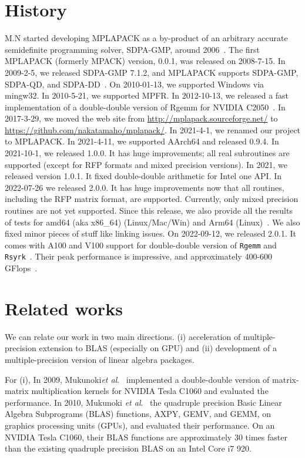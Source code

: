 \documentclass[12pt]{article}
\newcommand{\etal}{\textit{et al}.}
\begin{document}
\section{History}
\label{sec:history}
M.N started developing MPLAPACK as a by-product of an arbitrary accurate semidefinite programming solver, SDPA-GMP, around 2006~\cite{JCP2008}. The first MPLAPACK (formerly MPACK) version, 0.0.1, was released on 2008-7-15. In 2009-2-5, we released SDPA-GMP 7.1.2, and MPLAPACK supports SDPA-GMP, SDPA-QD, and SDPA-DD~\cite{SDPA-GMP,sdpa-gmpgithub,sdpa-qdgithub,sdpa-ddgithub}. On 2010-01-13, we supported Windows via mingw32. In 2010-5-21, we supported MPFR. In 2012-10-13, we released a fast implementation of a double-double version of Rgemm for NVIDIA C2050~\cite{6424545,6495966}. In 2017-3-29, we moved the web site from \url{http://mplapack.sourceforge.net/} to \url{https://github.com/nakatamaho/mplapack/}. In 2021-4-1, we renamed our project to MPLAPACK. In 2021-4-11, we supported AArch64 and released 0.9.4. In 2021-10-1, we released 1.0.0. It has huge improvements; all real subroutines are supported (except for RFP formats and mixed precision versions). In 2021, we released version 1.0.1. It fixed double-double arithmetic for Intel one API. In 2022-07-26 we released 2.0.0. It has huge improvements  now that all routines, including the RFP matrix format, are supported. Currently, only mixed precision routines are not yet supported. Since this release, we also provide all the results of tests for amd64 (aka x86\_64) (Linux/Mac/Win) and Arm64 (Linux)~\cite{lintest_mplapack,eigtest_mplapack}. We also fixed minor pieces of stuff like linking issues. On 2022-09-12, we released 2.0.1. It comes with A100 and V100 support for double-double version of {\tt Rgemm} and {\tt Rsyrk}~\cite{6424545,6495966}. Their peak performance is impressive, and approximately 400-600 GFlops~\cite{benchmark_mplapack}.

\section{Related works}
\label{sec:relatedworks}
We can relate our work in two main directions. (i) acceleration of multiple-precision extension to BLAS (especially on GPU) and (ii) development of a multiple-precision version of linear algebra packages.

For (i), In 2009, Mukunoki\etal{}~\cite{HPC-137_1} implemented a double-double version of matrix-matrix multiplication kernels for NVIDIA Tesla C1060 and evaluated the performance. In 2010, Mukunoki \etal{}~\cite{10.1007/978-3-642-28151-8_25} the quadruple precision Basic Linear Algebra Subprograms (BLAS) functions, AXPY, GEMV, and GEMM, on graphics processing units (GPUs), and evaluated their performance. On an NVIDIA Tesla C1060, their BLAS functions are approximately 30 times faster than the existing quadruple precision BLAS on an Intel Core i7 920.
\end{document}
